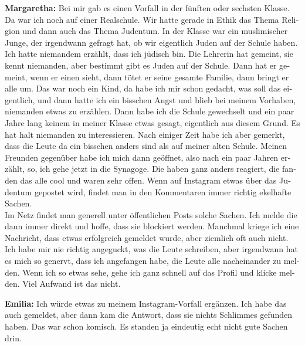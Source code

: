 \begin{otherlanguage}{ngerman}
\textbf{Margaretha:} Bei mir gab es einen Vorfall in der fünften oder sechsten Klasse. Da war ich noch auf einer Realschule. Wir hatte gerade in Ethik das Thema Religion und dann auch das Thema Judentum. In der Klasse war ein muslimischer Junge, der irgendwann gefragt hat, ob wir eigentlich Juden auf der Schule haben. Ich hatte niemandem erzählt, dass ich jüdisch bin. Die Lehrerin hat gemeint, sie kennt niemanden, aber bestimmt gibt es Juden auf der Schule. Dann hat er gemeint, wenn er einen sieht, dann tötet er seine gesamte Familie, dann bringt er alle um. Das war noch ein Kind, da habe ich mir schon gedacht, was soll das eigentlich, und dann hatte ich ein bisschen Angst und blieb bei meinem Vorhaben, niemanden etwas zu erzählen. Dann habe ich die Schule gewechselt und ein paar Jahre lang keinem in meiner Klasse etwas gesagt, eigentlich aus diesem Grund. Es hat halt niemanden zu interessieren. Nach einiger Zeit habe ich aber gemerkt, dass die Leute da ein bisschen anders sind als auf meiner alten Schule. Meinen Freunden gegenüber habe ich mich dann geöffnet, also nach ein paar Jahren erzählt, so, ich gehe jetzt in die Synagoge. Die haben ganz anders reagiert, die fanden das alle cool und waren sehr offen. Wenn auf Instagram etwas über das Judentum gepostet wird, findet man in den Kommentaren immer richtig ekelhafte Sachen.\\ 
Im Netz findet man generell unter öffentlichen Posts solche Sachen. Ich melde die dann immer direkt und hoffe, dass sie blockiert werden. Manchmal kriege ich eine Nachricht, dass etwas erfolgreich gemeldet wurde, aber ziemlich oft auch nicht. Ich habe mir nie richtig angeguckt, was die Leute schreiben, aber irgendwann hat es mich so genervt, dass ich angefangen habe, die Leute alle nacheinander zu melden. Wenn ich so etwas sehe, gehe ich ganz schnell auf das Profil und klicke melden. Viel Aufwand ist das nicht.  

\textbf{Emilia:} Ich würde etwas zu meinem Instagram-Vorfall ergänzen. Ich habe das auch gemeldet, aber dann kam die Antwort, dass sie nichts Schlimmes gefunden haben. Das war schon komisch. Es standen ja eindeutig echt nicht gute Sachen drin.  


\end{otherlanguage}
